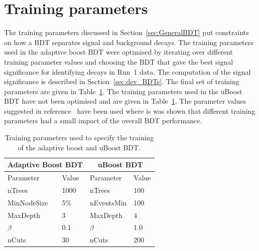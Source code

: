 \section{Training parameters}
The training parameters discussed in Section~\ref{sec:GeneralBDT} put constraints on how a BDT separates signal and background decays. 
The training parameters used in the adaptive boost BDT were optimised by iterating over different training parameter values and choosing the BDT that gave the best signal significance for identifying \bhh decays in Run~1 data. The computation of the signal significance is described in Section~\ref{sec:dev_BDTs}. %
The final set of training parameters are given in Table~\ref{tab:ELtrainingparamss}. %
The training parameters used in the uBoost BDT have not been optimised and are given in Table~\ref{tab:ELtrainingparamss}. The parameter values suggested in reference~\cite{Stevens:2013dya} have been used where is was shown that different training parameters had a small impact of the overall BDT performance. %
\begin{table}[htbp]
\begin{center}
\begin{tabular}{llll}
\toprule \toprule
\multicolumn{2}{c}{Adaptive Boost BDT} & \multicolumn{2}{c}{uBoost BDT} \\ \midrule
Parameter & Value & Parameter & Value\\ \midrule
nTrees & 1000 &  nTrees & 100\\
MinNodeSize & 5$\%$ & nEventsMin & 100 \\
MaxDepth & 3 & MaxDepth & 4 \\
$\beta$ & 0.1 & $\beta$ & 1.0 \\
nCuts & 30 & nCuts & 200 \\
\bottomrule \bottomrule
\end{tabular}
\vspace{0.7cm}
\caption{Training parameters used to specify the training of the adaptive boost and uBoost BDT.}
\label{tab:ELtrainingparamss}
\end{center}
\vspace{-1.0cm}
\end{table}


